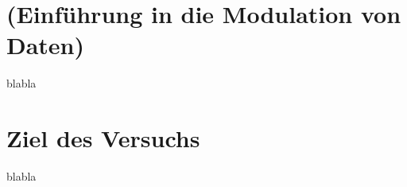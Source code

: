     \section{(Einführung in die Modulation von Daten)}
    blabla
    \section{Ziel des Versuchs}
    blabla
\clearpage